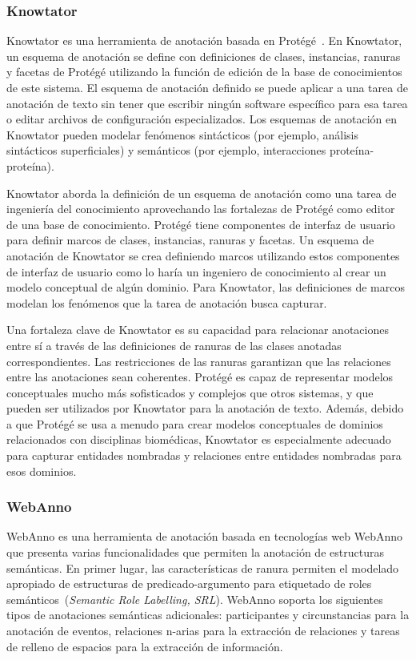 \subsubsection*{Knowtator}

Knowtator es una herramienta de anotación basada en Protégé~\cite{protege}.
En Knowtator, un esquema de anotación se define con definiciones de clases, instancias, ranuras y facetas de Protégé utilizando la función de edición de la base de conocimientos de este sistema.
El esquema de anotación definido se puede aplicar a una tarea de anotación de texto sin tener que escribir ningún software específico para esa tarea o editar archivos de configuración especializados.
Los esquemas de anotación en Knowtator pueden modelar fenómenos sintácticos (por ejemplo, análisis sintácticos superficiales) y semánticos (por ejemplo, interacciones proteína-proteína).

Knowtator aborda la definición de un esquema de anotación como una tarea de ingeniería del conocimiento aprovechando las fortalezas de Protégé como editor de una base de conocimiento.
Protégé tiene componentes de interfaz de usuario para definir marcos de clases, instancias, ranuras y facetas.
Un esquema de anotación de Knowtator se crea definiendo marcos utilizando estos componentes de interfaz de usuario como lo haría un ingeniero de conocimiento al crear un modelo conceptual de algún dominio.
Para Knowtator, las definiciones de marcos modelan los fenómenos que la tarea de anotación busca capturar.

Una fortaleza clave de Knowtator es su capacidad para relacionar anotaciones entre sí a través de las definiciones de ranuras de las clases anotadas correspondientes.
Las restricciones de las ranuras garantizan que las relaciones entre las anotaciones sean coherentes.
Protégé es capaz de representar modelos conceptuales mucho más sofisticados y complejos que otros sistemas, y que pueden ser utilizados por Knowtator para la anotación de texto.
Además, debido a que Protégé se usa a menudo para crear modelos conceptuales de dominios relacionados con disciplinas biomédicas, Knowtator es especialmente adecuado para capturar entidades nombradas y relaciones entre entidades nombradas para esos dominios.

\subsubsection*{WebAnno}

WebAnno es una herramienta de anotación basada en tecnologías web WebAnno que presenta varias funcionalidades que permiten la anotación de estructuras semánticas.
En primer lugar, las características de ranura permiten el modelado apropiado de estructuras de predicado-argumento para etiquetado de roles semánticos~(\textit{Semantic Role Labelling, SRL}).
WebAnno soporta los siguientes tipos de anotaciones semánticas adicionales: participantes y circunstancias para la anotación de eventos, relaciones n-arias para la extracción de relaciones y tareas de relleno de espacios para la extracción de información.

